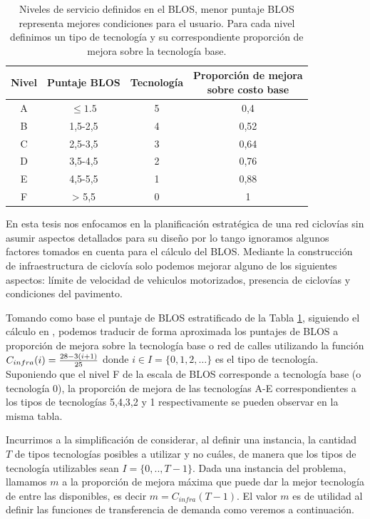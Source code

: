 \begin{table}[h!]
  \centering
  \begin{tabular}{cccc}
    \toprule
      Nivel & Puntaje BLOS & Tecnología & \shortstack{Proporción de mejora \\ sobre costo base} \\
    \midrule
      A     & $\leq 1.5$   & 5              & 0,4   \\
      B     & 1,5-2,5      & 4              & 0,52  \\
      C     & 2,5-3,5      & 3              & 0,64  \\
      D     & 3,5-4,5      & 2              & 0,76  \\
      E     & 4,5-5,5      & 1              & 0,88  \\
      F     & > 5,5        & 0              & 1     \\
    \bottomrule
  \end{tabular}
  \caption{Niveles de servicio definidos en el BLOS, menor puntaje BLOS representa mejores condiciones para el usuario. Para cada nivel definimos un tipo de tecnología y su correspondiente proporción de mejora sobre la tecnología base.}\label{table:blosscores}
\end{table}

En esta tesis nos enfocamos en la planificación estratégica de una red ciclovías sin asumir aspectos detallados para su diseño por lo tango ignoramos algunos factores tomados en cuenta para el cálculo del BLOS. Mediante la construcción de infraestructura de ciclovía solo podemos mejorar alguno de los siguientes aspectos: límite de velocidad de vehiculos motorizados, presencia de ciclovías y condiciones del pavimento.

Tomando como base el puntaje de BLOS estratificado de la Tabla \ref{table:blosscores}, siguiendo el cálculo en \cite{baya2021}, podemos traducir de forma aproximada los puntajes de BLOS a proporción de mejora sobre la tecnología base o red de calles utilizando la función $C_{infra}(i) = {28 - 3 (i + 1) \over 25}$ donde $i \in I = \{0,1,2,\ldots\}$ es el tipo de tecnología. Suponiendo que el nivel F de la escala de BLOS corresponde a tecnología base (o tecnología 0), la proporción de mejora de las tecnologías A-E correspondientes a los tipos de tecnologías 5,4,3,2 y 1 respectivamente se pueden observar en la misma tabla.

Incurrimos a la simplificación de considerar, al definir una instancia, la cantidad $T$ de tipos tecnologías posibles a utilizar y no cuáles, de manera que los tipos de tecnología utilizables sean $I = \{0,.., T - 1\}$. Dada una instancia del problema, llamamos $m$ a la proporción de mejora máxima que puede dar la mejor tecnología de entre las disponibles, es decir $m = C_{infra}(T - 1)$. El valor $m$ es de utilidad al definir las funciones de transferencia de demanda como veremos a continuación.

